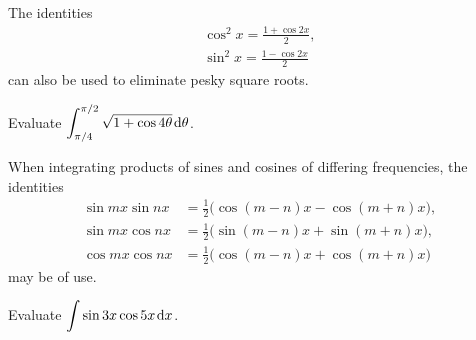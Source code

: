\newpage

\begin{remark}
The identities 
\begin{align*}
\cos^2 x = \frac{1+\cos 2x}{2},\\
\sin^2 x = \frac{1-\cos 2x}{2}
\end{align*}
can also be used to eliminate pesky square roots.
\end{remark}

\begin{example}
Evaluate $\displaystyle\int_{\pi/4}^{\pi/2}\sqrt{1+\cos 4\theta}\mkern 2mu \mathrm{d}\theta$.
\end{example}
\ifdefined\SOLUTION
{}
\fi
\newpage

\begin{remark}
When integrating products of sines and cosines of differing frequencies, the identities
\begin{align*}
\sin mx\sin nx &= \frac{1}{2}\big(\cos(m-n)x - \cos(m+n)x\big),\\
\sin mx\cos nx &= \frac{1}{2}\big(\sin(m-n)x + \sin(m+n)x\big),\\
\cos mx\cos nx &= \frac{1}{2}\big(\cos(m-n)x + \cos(m+n)x\big)
\end{align*}
may be of use.
\end{remark}

\begin{example}
Evaluate $\displaystyle\int \sin 3x\cos 5x\mkern 2mu \mathrm{d} x$.
\end{example}
\ifdefined\SOLUTION
{}
\fi

